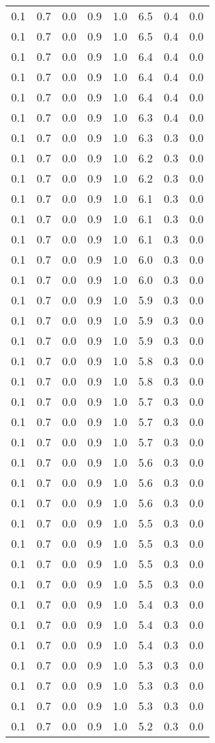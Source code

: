 \begin{tabular}{L{1in}|L{1in}|L{1in}|L{1in}|L{1in}|L{1in}|L{1in}|L{1in}}
0.1&0.7&0.0&0.9&1.0&6.5&0.4&0.0\\
0.1&0.7&0.0&0.9&1.0&6.5&0.4&0.0\\
0.1&0.7&0.0&0.9&1.0&6.4&0.4&0.0\\
0.1&0.7&0.0&0.9&1.0&6.4&0.4&0.0\\
0.1&0.7&0.0&0.9&1.0&6.4&0.4&0.0\\
0.1&0.7&0.0&0.9&1.0&6.3&0.4&0.0\\
0.1&0.7&0.0&0.9&1.0&6.3&0.3&0.0\\
0.1&0.7&0.0&0.9&1.0&6.2&0.3&0.0\\
0.1&0.7&0.0&0.9&1.0&6.2&0.3&0.0\\
0.1&0.7&0.0&0.9&1.0&6.1&0.3&0.0\\
0.1&0.7&0.0&0.9&1.0&6.1&0.3&0.0\\
0.1&0.7&0.0&0.9&1.0&6.1&0.3&0.0\\
0.1&0.7&0.0&0.9&1.0&6.0&0.3&0.0\\
0.1&0.7&0.0&0.9&1.0&6.0&0.3&0.0\\
0.1&0.7&0.0&0.9&1.0&5.9&0.3&0.0\\
0.1&0.7&0.0&0.9&1.0&5.9&0.3&0.0\\
0.1&0.7&0.0&0.9&1.0&5.9&0.3&0.0\\
0.1&0.7&0.0&0.9&1.0&5.8&0.3&0.0\\
0.1&0.7&0.0&0.9&1.0&5.8&0.3&0.0\\
0.1&0.7&0.0&0.9&1.0&5.7&0.3&0.0\\
0.1&0.7&0.0&0.9&1.0&5.7&0.3&0.0\\
0.1&0.7&0.0&0.9&1.0&5.7&0.3&0.0\\
0.1&0.7&0.0&0.9&1.0&5.6&0.3&0.0\\
0.1&0.7&0.0&0.9&1.0&5.6&0.3&0.0\\
0.1&0.7&0.0&0.9&1.0&5.6&0.3&0.0\\
0.1&0.7&0.0&0.9&1.0&5.5&0.3&0.0\\
0.1&0.7&0.0&0.9&1.0&5.5&0.3&0.0\\
0.1&0.7&0.0&0.9&1.0&5.5&0.3&0.0\\
0.1&0.7&0.0&0.9&1.0&5.5&0.3&0.0\\
0.1&0.7&0.0&0.9&1.0&5.4&0.3&0.0\\
0.1&0.7&0.0&0.9&1.0&5.4&0.3&0.0\\
0.1&0.7&0.0&0.9&1.0&5.4&0.3&0.0\\
0.1&0.7&0.0&0.9&1.0&5.3&0.3&0.0\\
0.1&0.7&0.0&0.9&1.0&5.3&0.3&0.0\\
0.1&0.7&0.0&0.9&1.0&5.3&0.3&0.0\\
0.1&0.7&0.0&0.9&1.0&5.2&0.3&0.0\\

\end{tabular}
